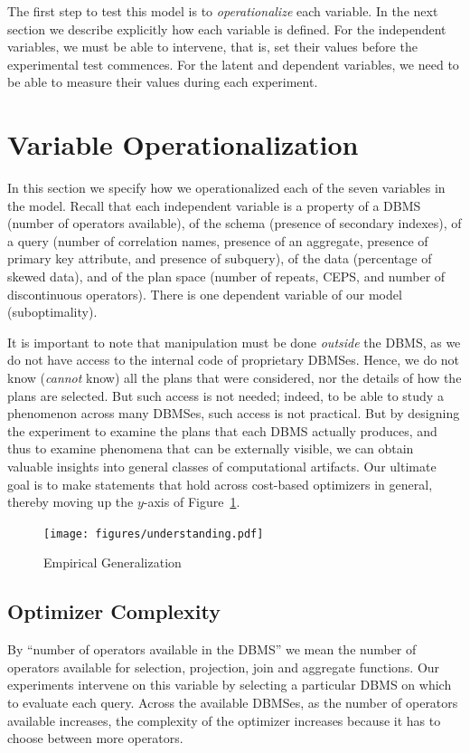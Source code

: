 \documentclass[prodmode,acmtods]{acmsmall}
\begin{document}
The first step to test this model is to {\em operationalize} each
variable. In the next section we describe explicitly how each variable is
defined. For the independent variables, we must be able to intervene, that is,
set their values before the experimental test commences. For the latent and
dependent variables, we need to be able to measure their values during each experiment.

\section{Variable Operationalization}\label{sec:operationalization}

In this section we specify how we operationalized each of the seven
variables in the model.  Recall that each independent variable is a property
of a \hbox{DBMS} (number of operators available), of the schema (presence
  of secondary indexes), of a query (number of correlation names,
presence of an aggregate, presence of primary key attribute, and
presence of subquery), of the data (percentage of skewed data), and of
the plan space (number of repeats, CEPS, and number of discontinuous
operators). There is 
one dependent variable of our model (suboptimality).

It is important to note that manipulation must be done {\em
  outside} the \hbox{DBMS}, as we do not have access to the
internal code of proprietary DBMSes. Hence, we do not know ({\em cannot} know) all the plans that were
considered, nor the details of how the plans are selected. But such access
is not needed; indeed, to be able to study a phenomenon across many \hbox{DBMSes},
such access is not practical. But by designing the experiment to examine
the plans that each \hbox{DBMS} actually produces, and thus to examine phenomena
that can be externally visible, we can obtain valuable insights into general
classes of computational artifacts. Our ultimate goal is to make statements
that hold across cost-based optimizers in general, thereby moving up the
$y$-axis of Figure~\ref{fig:empirical}.

\begin{figure}[t]
\centering
\texttt{[image: figures/understanding.pdf]}%
\caption{Empirical Generalization\label{fig:empirical}}
\end{figure}


\subsection{Optimizer Complexity}
By ``number of operators available in the \hbox{DBMS}'' we mean the \hbox{number} of operators
available for selection, projection, join and aggregate functions. Our
experiments intervene on this variable by selecting a particular \hbox{DBMS} on
which to evaluate each query. Across the available \hbox{DBMSes}, as the number of
operators available increases, the complexity of the optimizer increases
because it has to choose between more operators.
\end{document}
